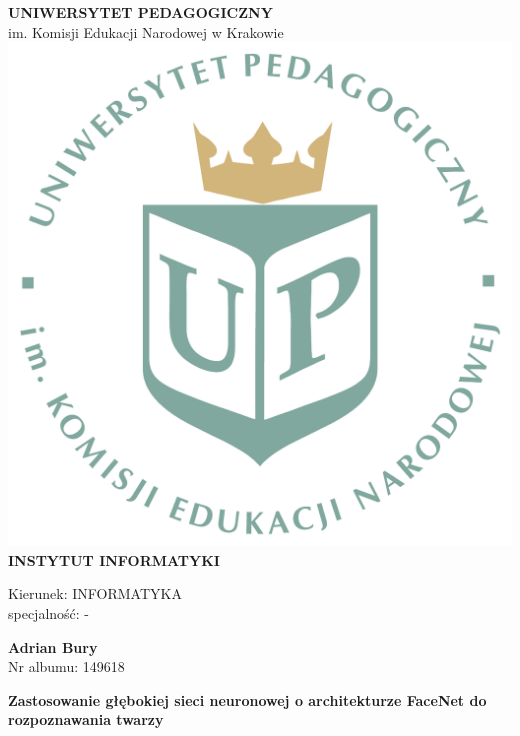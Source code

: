 \begin{titlepage}
    \begin{center}

    {\Large \textbf{UNIWERSYTET PEDAGOGICZNY}}
        \\[0.2cm]
        {\Large im. Komisji Edukacji Narodowej w Krakowie}\\[1cm]

        \includegraphics[scale=0.25]{images/logoUP_pl}\\[1cm]
        {\large \textbf{INSTYTUT INFORMATYKI}}

        \vspace{0.2cm}
        Kierunek: INFORMATYKA\\[0.2cm]
        specjalność: -

        \vspace{1.5cm}


        {\Large \textbf{Adrian Bury} \\[0.3cm] }
        {\large Nr albumu: 149618 \\[0.3cm]}

        {\Large \textbf{
            Zastosowanie głębokiej sieci neuronowej \linebreak o architekturze FaceNet
            do rozpoznawania twarzy
        } \\[2.0cm] }



\end{center}
\end{titlepage}
